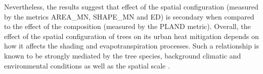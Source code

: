 \documentclass[10pt,letterpaper]{article}
\begin{document}
Nevertheless, the results suggest that effect of the spatial configuration (measured by the metrics AREA\_MN, SHAPE\_MN and ED) is secondary when compared to the effect of the composition (measured by the PLAND metric).
Overall, the effect of the spatial configuration of trees on its urban heat mitigation depends on how it affects the shading and evapotranspiration processes.
Such a relationship is known to be strongly mediated by the tree species, background climatic and environmental conditions as well as the spatial scale \cite{li2013relationship,estoque2017effects,zhou2017effects,jiao2017patch,yu2018strong,yan2019testing,wang2020significant,terfa2020spatial}.
\end{document}
